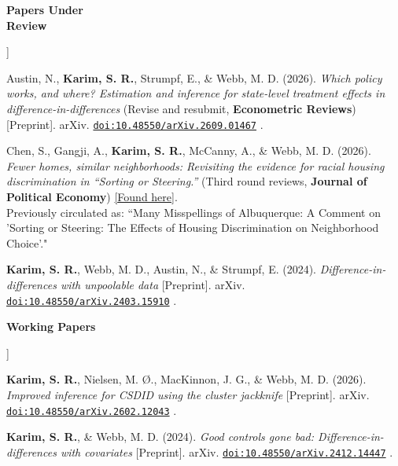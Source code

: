 \documentclass[11pt]{article}
\newcommand{\cvlabel}[1]{%
    \raisebox{0pt}[0pt][0pt]{%
        \parbox[t]{1.38in}{%
            \raggedright
            \bfseries
            #1
        }%
    }%
}
\newcommand{\myname}{\textbf{Karim, S. R.}}
\newcommand{\doi}[1]{%
    \href{https://doi.org/#1}{\nolinkurl{doi:#1}}%
}
\begin{document}
\begin{cvsections}
\item[\cvlabel{Papers Under\\Review}]

\begin{cvitems}

\item
Austin, N.,
\textbf{Karim, S. R.},
Strumpf, E.,
\& Webb, M. D. (2026).
\textit{
Which policy works, and where?
Estimation and inference for state-level treatment effects
in difference-in-differences
}
(Revise and resubmit, \textbf{Econometric Reviews})
[Preprint].
arXiv.
\doi{10.48550/arXiv.2609.01467}.


\item
Chen, S.,
Gangji, A.,
\textbf{Karim, S. R.},
McCanny, A.,
\& Webb, M. D. (2026).
\textit{
Fewer homes, similar neighborhoods:
Revisiting the evidence for racial housing discrimination
in ``Sorting or Steering.''
}
(Third round reviews,
\textbf{Journal of Political Economy})
\href{https://github.com/SunnyRKarim/HUD-paper}{[Found here]}.
\\
Previously circulated as:
``Many Misspellings of Albuquerque: A Comment on 'Sorting or Steering: The Effects of Housing Discrimination on Neighborhood Choice'."


\item
\myname{},
Webb, M. D.,
Austin, N.,
\& Strumpf, E. (2024).
\textit{
Difference-in-differences with unpoolable data
}
[Preprint].
arXiv.
\doi{10.48550/arXiv.2403.15910}.


\end{cvitems}


\item[\cvlabel{Working Papers}]

\begin{cvitems}

\item
\myname{},
Nielsen, M. Ø.,
MacKinnon, J. G.,
\& Webb, M. D. (2026).
\textit{
Improved inference for CSDID using the cluster jackknife
}
[Preprint].
arXiv.
\doi{10.48550/arXiv.2602.12043}.



\item
\myname{},
\& Webb, M. D. (2024).
\textit{
Good controls gone bad:
Difference-in-differences with covariates
}
[Preprint].
arXiv.
\doi{10.48550/arXiv.2412.14447}.



\end{cvitems}
\end{cvsections}
\end{document}
